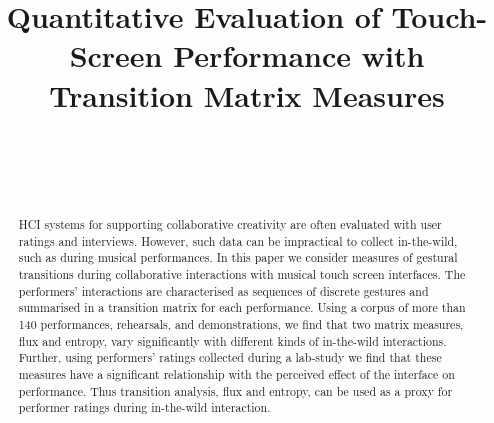 \documentclass{sigchi}
\begin{document}
\title{Quantitative Evaluation of Touch-Screen Performance with
  Transition Matrix Measures}

\author{%
  \\
  \\
  \\
}

\maketitle

\begin{abstract}
  HCI systems for supporting collaborative creativity are often
  evaluated with user ratings and interviews. However, such data can
  be impractical to collect in-the-wild, such as during musical
  performances. In this paper we consider measures of gestural
  transitions during collaborative interactions with musical touch
  screen interfaces. The performers' interactions are characterised as
  sequences of discrete gestures and summarised in a transition matrix
  for each performance. Using a corpus of more than 140 performances,
  rehearsals, and demonstrations, we find that two matrix measures,
  flux and entropy, vary significantly with different kinds of
  in-the-wild interactions. Further, using performers' ratings
  collected during a lab-study we find that these measures have a
  significant relationship with the perceived effect of the interface
  on performance. Thus transition analysis, flux and entropy, can be
  used as a proxy for performer ratings during in-the-wild interaction.
\end{abstract}


\end{document}
